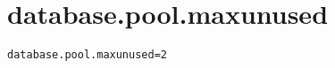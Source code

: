 \section{database.pool.maxunused}
\label{configuration:DatabasePoolMaxunused}
\ClearAPI
\TODO
{}
\begin{lstlisting}[style=Props,caption={Usage example for \textit{database.pool.maxunused}}]
database.pool.maxunused=2
\end{lstlisting}
